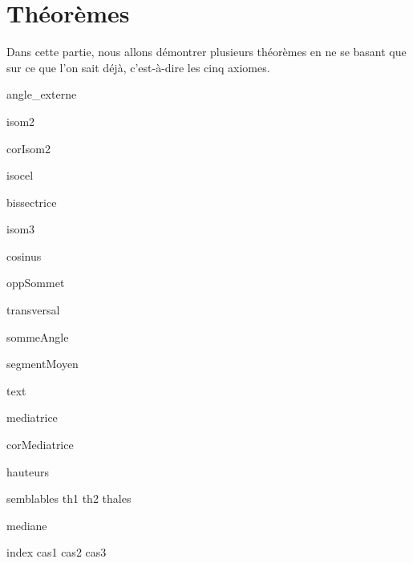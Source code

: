 \documentclass[a4paper,12pt]{article}
\begin{document}
\section{Théorèmes}
Dans cette partie, nous allons démontrer plusieurs théorèmes en ne se basant que sur ce que l'on sait déjà, c'est-à-dire les cinq axiomes.

{angle_externe}

{isom2}

{corIsom2}

{isocel}

{bissectrice}

{isom3}

{cosinus}

{oppSommet}

{transversal}

{sommeAngle}

{segmentMoyen}

{text}

{mediatrice}
 
{corMediatrice}

{hauteurs}

{semblables}
{th1}
{th2}
{thales}

{mediane}

{index}
{cas1}
{cas2}
{cas3}
\end{document}
